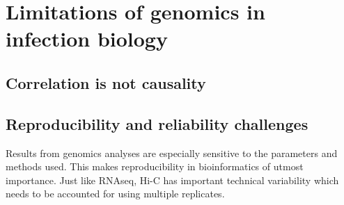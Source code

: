
\chapter{Limitations of genomics in infection biology} %

\label{ch:03-01} %



\section{Correlation is not causality}


\section{Reproducibility and reliability challenges}
Results from genomics analyses are especially sensitive to the parameters and methods used. This makes reproducibility in bioinformatics of utmost importance. Just like RNAseq, Hi-C has important technical variability which needs to be accounted for using multiple replicates.
